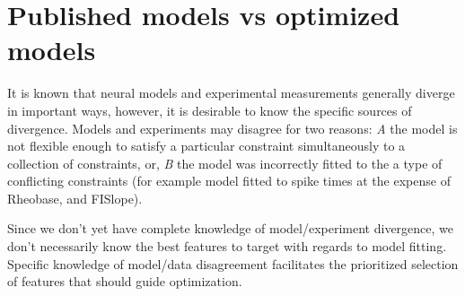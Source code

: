 

\section{Published models vs optimized models}

It is known that neural models and experimental measurements generally diverge in important ways, however, it is desirable to know the specific sources of divergence. Models and experiments may disagree for two reasons: \emph{A} the model is not flexible enough to satisfy a particular constraint simultaneously to a collection of constraints, or, \emph{B} the model was incorrectly fitted to the a type of conflicting constraints (for example model fitted to spike times at the expense of Rheobase, and FISlope). 

Since we don't yet have complete knowledge of model/experiment divergence, we don't necessarily know the best features to target with regards to model fitting. Specific knowledge of model/data disagreement facilitates the prioritized selection of features that should guide optimization. 






